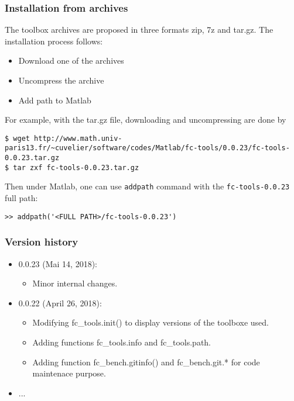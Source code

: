 
\subsubsection{Installation from archives}
The toolbox archives are proposed in three formats zip, 7z and tar.gz. The installation process follows:
\begin{itemize}
\item Download one of the archives
\item Uncompress the archive
\item Add path to Matlab
\end{itemize}

For example, with the tar.gz file, downloading and uncompressing are done by 
\begin{verbatim}
$ wget http://www.math.univ-paris13.fr/~cuvelier/software/codes/Matlab/fc-tools/0.0.23/fc-tools-0.0.23.tar.gz
$ tar zxf fc-tools-0.0.23.tar.gz
\end{verbatim}
Then under Matlab, one can use \texttt{addpath} command with the \texttt{fc-tools-0.0.23} full path:
\begin{verbatim}
>> addpath('<FULL PATH>/fc-tools-0.0.23')
\end{verbatim}

\subsubsection{Version history}

\begin{itemize}
\item 0.0.23 (Mai 14, 2018):
\begin{itemize}
\item Minor internal changes.
\end{itemize}
\item 0.0.22 (April 26, 2018): 
\begin{itemize}
\item Modifying fc_tools.init() to display versions of the toolboxe used.
\item Adding functions fc_tools.info and fc_tools.path.
\item Adding function fc_bench.gitinfo() and fc_bench.git.* for code maintenace purpose.
\end{itemize}
\item ...
\end{itemize}
 
